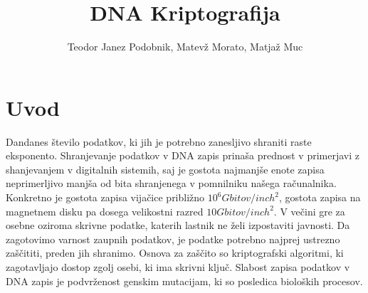 \documentclass[graybox, envcountchap]{svmult}
\begin{document}
\title{DNA Kriptografija}
\author{Teodor Janez Podobnik, Matevž Morato, Matjaž Muc}
%
%
\maketitle


\section{Uvod}
\label{g01:sec:1}

Dandanes število podatkov, ki jih je potrebno zanesljivo shraniti raste eksponento. Shranjevanje podatkov v DNA zapis prinaša prednost v primerjavi z shanjevanjem v digitalnih sistemih, saj je gostota najmanjše enote zapisa neprimerljivo manjša od bita shranjenega v pomnilniku našega računalnika. Konkretno je gostota zapisa vijačice približno \begin{math}10^6 Gbitov / inch ^2\end{math}, gostota zapisa na magnetnem disku pa dosega velikostni razred \begin{math}10 Gbitov / inch ^2\end{math}. V večini gre za osebne oziroma skrivne podatke, katerih lastnik ne želi izpostaviti javnosti. Da zagotovimo varnost zaupnih podatkov, je podatke potrebno najprej ustrezno zaščititi, preden jih shranimo. Osnova za zaščito so kriptografski algoritmi, ki zagotavljajo dostop zgolj osebi, ki ima skrivni ključ. Slabost zapisa podatkov v DNA zapis je podvrženost genskim mutacijam, ki so posledica bioloških procesov. 
\end{document}
